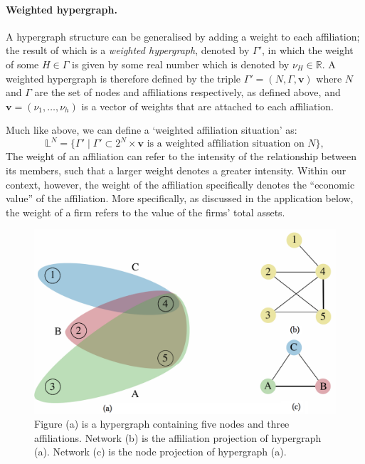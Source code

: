 \paragraph{Weighted hypergraph.}

A hypergraph structure can be generalised by adding a weight to each affiliation; the result of which is a \emph{weighted hypergraph}, denoted by $\Gamma'$, in which the weight of some $H \in \Gamma$ is given by some real number which is denoted by $\nu_{H} \in \mathbb{R}$. A weighted hypergraph is therefore defined by the triple $\Gamma' = (N, \Gamma, \mathbf{v})$ where $N$ and $\Gamma$ are the set of nodes and affiliations respectively, as defined above, and $\mathbf{v} = (\nu_{1}, \ldots , \nu_{h})$ is a vector of weights that are attached to each affiliation.

Much like above, we can define a `weighted affiliation situation' as:
\begin{equation*}
\mathbb{L}^N = \{ \Gamma' \mid \Gamma' \subset 2^N \times \mathbf{v} \mbox{ is a weighted affiliation situation on } N \} ,
\end{equation*}
The weight of an affiliation can refer to the intensity of the relationship between its members, such that a larger weight denotes a greater intensity. Within our context, however, the weight of the affiliation specifically denotes the ``economic value'' of the affiliation. More specifically, as discussed in the application below, the weight of a firm refers to the value of the firms' total assets.

\begin{figure}[t]
\begin{center}
\includegraphics[scale=0.28]{Images/hypergraph.png}
\end{center}
\caption[Hypergraph and network projections]{Figure (a) is a hypergraph containing five nodes and three affiliations. Network (b) is the affiliation projection of hypergraph (a). Network (c) is the node projection of hypergraph (a).}
\label{hypergraph}
\end{figure}

